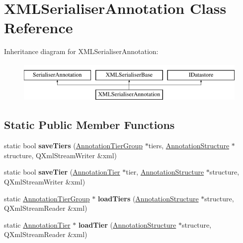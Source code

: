 \hypertarget{class_x_m_l_serialiser_annotation}{}\section{X\+M\+L\+Serialiser\+Annotation Class Reference}
\label{class_x_m_l_serialiser_annotation}
Inheritance diagram for X\+M\+L\+Serialiser\+Annotation\+:\begin{figure}[H]
\begin{center}
\leavevmode
\includegraphics[height=2.000000cm]{class_x_m_l_serialiser_annotation}
\end{center}
\end{figure}
\subsection*{Static Public Member Functions}
\begin{DoxyCompactItemize}
\item 
\mbox{\label{class_x_m_l_serialiser_annotation_a826908e7084121f0817376456e3c15e8}} 
static bool {\bfseries save\+Tiers} (\hyperlink{class_annotation_tier_group}{Annotation\+Tier\+Group} $\ast$tiers, \hyperlink{class_annotation_structure}{Annotation\+Structure} $\ast$structure, Q\+Xml\+Stream\+Writer \&xml)
\item 
\mbox{\label{class_x_m_l_serialiser_annotation_a655a88ebc1045b281163e58403903fb6}} 
static bool {\bfseries save\+Tier} (\hyperlink{class_annotation_tier}{Annotation\+Tier} $\ast$tier, \hyperlink{class_annotation_structure}{Annotation\+Structure} $\ast$structure, Q\+Xml\+Stream\+Writer \&xml)
\item 
\mbox{\label{class_x_m_l_serialiser_annotation_a8f97fadf35e73ac26e36000a6e3e8b7c}} 
static \hyperlink{class_annotation_tier_group}{Annotation\+Tier\+Group} $\ast$ {\bfseries load\+Tiers} (\hyperlink{class_annotation_structure}{Annotation\+Structure} $\ast$structure, Q\+Xml\+Stream\+Reader \&xml)
\item 
\mbox{\label{class_x_m_l_serialiser_annotation_a16a3b9be470c172d86d5b07de8d668e5}} 
static \hyperlink{class_annotation_tier}{Annotation\+Tier} $\ast$ {\bfseries load\+Tier} (\hyperlink{class_annotation_structure}{Annotation\+Structure} $\ast$structure, Q\+Xml\+Stream\+Reader \&xml)
\end{DoxyCompactItemize}
